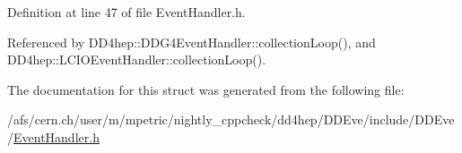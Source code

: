 Definition at line 47 of file EventHandler.h.

Referenced by DD4hep::DDG4EventHandler::collectionLoop(), and DD4hep::LCIOEventHandler::collectionLoop().

The documentation for this struct was generated from the following file:\begin{DoxyCompactItemize}
\item 
/afs/cern.ch/user/m/mpetric/nightly\_\-cppcheck/dd4hep/DDEve/include/DDEve/\hyperlink{_event_handler_8h}{EventHandler.h}\end{DoxyCompactItemize}
